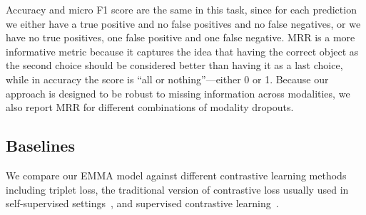 \documentclass[sigconf,natbib=true,anonymous=true]{acmart}
\begin{document}
Accuracy and micro F1 score
are the same in this task, since for each prediction we either have a true positive and no false positives and no false negatives, or we have no true positives, one false positive and one false negative. MRR is a more informative metric because it captures the idea that having the correct object as the second choice should be considered better than having it as a last choice, while in accuracy the score is ``all or nothing''---either 0 or 1. Because our approach is designed to be robust to missing information across modalities, we also report MRR for different combinations of modality dropouts. 


\subsection{Baselines}
We compare our EMMA model against different contrastive learning methods including triplet loss, the traditional version of contrastive loss usually used in self-supervised settings~\cite{chen2020simple}, and supervised contrastive learning~\cite{NEURIPS2020_supervised_contrastive}. 
\end{document}
